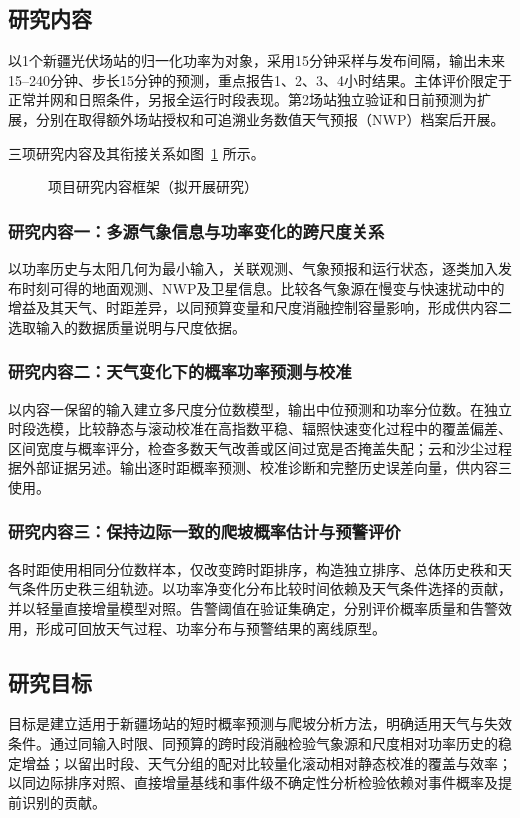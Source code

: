 \subsection{研究内容}
以1个新疆光伏场站的归一化功率为对象，采用15分钟采样与发布间隔，输出未来15--240分钟、步长15分钟的预测，重点报告1、2、3、4小时结果。主体评价限定于正常并网和日照条件，另报全运行时段表现。第2场站独立验证和日前预测为扩展，分别在取得额外场站授权和可追溯业务数值天气预报（NWP）档案后开展。

三项研究内容及其衔接关系如图~\ref{fig:xj-content-framework} 所示。
\begin{figure}[!ht]
\centering

\caption{项目研究内容框架（拟开展研究）}
\label{fig:xj-content-framework}
\end{figure}

\subsubsection{研究内容一：多源气象信息与功率变化的跨尺度关系}
以功率历史与太阳几何为最小输入，关联观测、气象预报和运行状态，逐类加入发布时刻可得的地面观测、NWP及卫星信息。比较各气象源在慢变与快速扰动中的增益及其天气、时距差异，以同预算变量和尺度消融控制容量影响，形成供内容二选取输入的数据质量说明与尺度依据。

\subsubsection{研究内容二：天气变化下的概率功率预测与校准}
以内容一保留的输入建立多尺度分位数模型，输出中位预测和功率分位数。在独立时段选模，比较静态与滚动校准在高指数平稳、辐照快速变化过程中的覆盖偏差、区间宽度与概率评分，检查多数天气改善或区间过宽是否掩盖失配；云和沙尘过程据外部证据另述。输出逐时距概率预测、校准诊断和完整历史误差向量，供内容三使用。

\subsubsection{研究内容三：保持边际一致的爬坡概率估计与预警评价}
各时距使用相同分位数样本，仅改变跨时距排序，构造独立排序、总体历史秩和天气条件历史秩三组轨迹。以功率净变化分布比较时间依赖及天气条件选择的贡献，并以轻量直接增量模型对照。告警阈值在验证集确定，分别评价概率质量和告警效用，形成可回放天气过程、功率分布与预警结果的离线原型。

\subsection{研究目标}
目标是建立适用于新疆场站的短时概率预测与爬坡分析方法，明确适用天气与失效条件。通过同输入时限、同预算的跨时段消融检验气象源和尺度相对功率历史的稳定增益；以留出时段、天气分组的配对比较量化滚动相对静态校准的覆盖与效率；以同边际排序对照、直接增量基线和事件级不确定性分析检验依赖对事件概率及提前识别的贡献。

